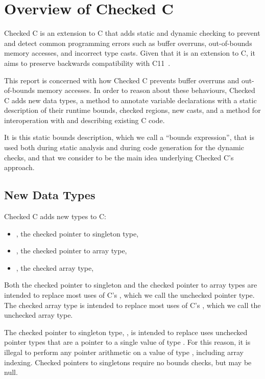 \chapter{Overview of Checked C}
\label{sec:checkedc}

Checked C is an extension to C that adds static and dynamic checking
to prevent and detect common programming errors such as buffer
overruns, out-of-bounds memory accesses, and incorrect type casts.
Given that it is an extension to C, it aims to preserve backwards
compatibility with C11~\cite{ISO2011}.

This report is concerned with how Checked C prevents buffer overruns
and out-of-bounds memory accesses. In order to reason about these
behaviours, Checked C adds new data types, a method to annotate
variable declarations with a static description of their runtime
bounds, checked regions, new casts, and a method for interoperation
with and describing existing C code.

It is this static bounds description, which we call a ``bounds
expression'', that is used both during static analysis and during code
generation for the dynamic checks, and that we consider to be the main
idea underlying Checked C's approach.

\section{New Data Types}

Checked C adds new types to C:

\begin{itemize}
\item \PtrT, the checked pointer to singleton type,
\item \ArrayptrT, the checked pointer to array type,
\item {}, the checked array type,
\end{itemize}

Both the checked pointer to singleton and the checked pointer to
array types are intended to replace most uses of C's \uncheckedptrT,
which we call the unchecked pointer type. The checked array type is
intended to replace most uses of C's , which we
call the unchecked array type.

The checked pointer to singleton type, \PtrT, is intended to replace
uses unchecked pointer types that are a
pointer to a single value of type . For this reason, it is
illegal to perform any pointer arithmetic on a value of type \PtrT,
including array indexing. Checked pointers to singletons require no
bounds checks, but may be null.

